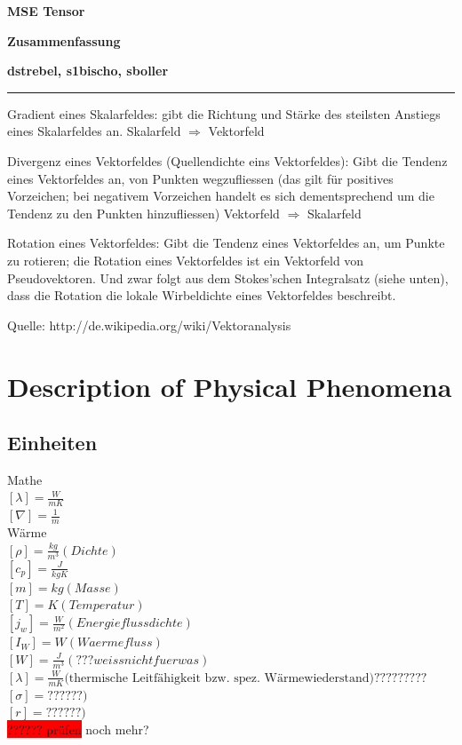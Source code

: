 \documentclass[a4paper]{scrartcl}
\begin{document}
\pagestyle{fancy}
\fancyhf{} 
\fancyfoot[C]{\thepage} %
\renewcommand{\headrulewidth}{0pt}
\renewcommand{\footrulewidth}{0.5pt}

 \centerline{\LARGE \bf \textsf{MSE Tensor}} 
 \smallskip
\centerline{\Large \bf \textsf {Zusammenfassung}}
\medskip
  \centerline{\bf \textsf{dstrebel, s1bischo, sboller }}

 \smallskip \noindent\rule{\textwidth}{0.5pt}
\smallskip%




Gradient eines Skalarfeldes: gibt die Richtung und Stärke des steilsten Anstiegs
eines Skalarfeldes an.
Skalarfeld $\Rightarrow$ Vektorfeld

Divergenz eines Vektorfeldes (Quellendichte eins Vektorfeldes): Gibt die Tendenz
eines Vektorfeldes an, von Punkten wegzufliessen (das gilt für positives
Vorzeichen; bei negativem Vorzeichen handelt es sich dementsprechend um die
Tendenz zu den Punkten hinzufliessen) Vektorfeld $\Rightarrow$ Skalarfeld

Rotation eines Vektorfeldes: Gibt die Tendenz eines Vektorfeldes an, um Punkte
zu rotieren; die Rotation eines Vektorfeldes ist ein Vektorfeld von
Pseudovektoren. Und zwar folgt aus dem Stokes’schen Integralsatz (siehe unten),
dass die Rotation die lokale Wirbeldichte eines Vektorfeldes beschreibt.

Quelle: http://de.wikipedia.org/wiki/Vektoranalysis



\section{Description of Physical Phenomena}
\subsection{Einheiten}

Mathe\\
$ [\lambda]=\frac{W}{mK} $\\
$ [\nabla]=\frac{1}{m} $\\

Wärme\\
$ [\rho]=\frac{kg}{m^3} (Dichte)$\\
$ [c_p]=\frac{J}{kgK} $\\
$ [m]=kg (Masse)$\\
$ [T]=K (Temperatur)$\\
$ [j_w]=\frac{W}{m^2} (Energieflussdichte)$\\
$ [I_W]=W (Waermefluss)$\\
$ [W]=\frac{J}{m^3} (???weiss nicht fuer was)$\\
$ [ \lambda ] = \frac{W}{mK} \text{(thermische Leitfähigkeit bzw. spez.  Wärmewiederstand)}????????? $\\
$ [ \sigma ]=??? ???)$\\
$ [ r ]=??? ???)$\\
\colorbox{red}{?????? prüfen} noch mehr? \\
\end{document}
